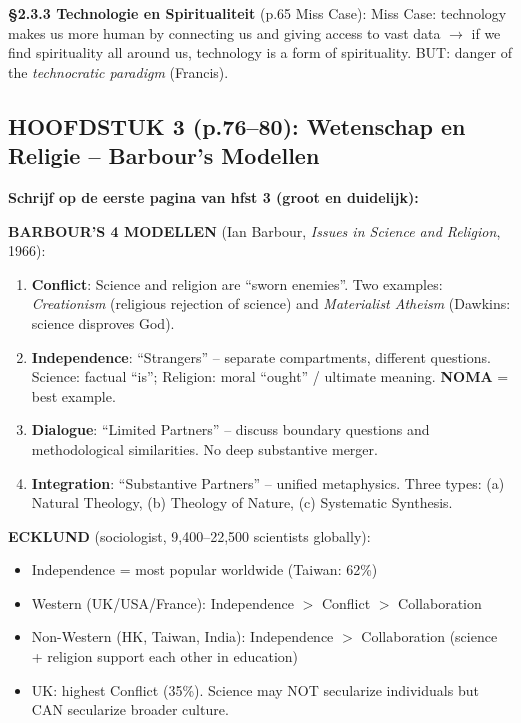 \documentclass[a4paper,10pt]{article}
\begin{document}
\textbf{§2.3.3 Technologie en Spiritualiteit} (p.65 Miss Case):
Miss Case: technology makes us more human by connecting us and giving access to vast data $\to$ if we find spirituality all around us, technology is a form of spirituality. BUT: danger of the \textit{technocratic paradigm} (Francis).

\vspace{3pt}

\subsection{HOOFDSTUK 3 (p.76--80): Wetenschap en Religie -- Barbour's Modellen}

\textbf{Schrijf op de eerste pagina van hfst 3 (groot en duidelijk):}

\textbf{BARBOUR'S 4 MODELLEN} (Ian Barbour, \textit{Issues in Science and Religion}, 1966):
\begin{enumerate}[noitemsep]
  \item \textbf{Conflict}: Science and religion are ``sworn enemies''. Two examples: \textit{Creationism} (religious rejection of science) and \textit{Materialist Atheism} (Dawkins: science disproves God).
  \item \textbf{Independence}: ``Strangers'' -- separate compartments, different questions. Science: factual ``is''; Religion: moral ``ought'' / ultimate meaning. \textbf{NOMA} = best example.
  \item \textbf{Dialogue}: ``Limited Partners'' -- discuss boundary questions and methodological similarities. No deep substantive merger.
  \item \textbf{Integration}: ``Substantive Partners'' -- unified metaphysics. Three types: (a) Natural Theology, (b) Theology of Nature, (c) Systematic Synthesis.
\end{enumerate}

\textbf{ECKLUND} (sociologist, 9,400--22,500 scientists globally):
\begin{itemize}[noitemsep]
  \item Independence = most popular worldwide (Taiwan: 62\%)
  \item Western (UK/USA/France): Independence $>$ Conflict $>$ Collaboration
  \item Non-Western (HK, Taiwan, India): Independence $>$ Collaboration (science + religion support each other in education)
  \item UK: highest Conflict (35\%). Science may NOT secularize individuals but CAN secularize broader culture.
\end{itemize}
\end{document}
